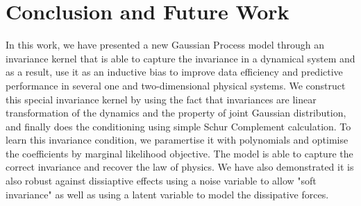 \documentclass{statsmsc}
\begin{document}
\chapter{Conclusion and Future Work}
In this work, we have presented a new Gaussian Process model through an invariance kernel that is able to capture the invariance in a dynamical system and as a result, use it as an inductive bias to improve data efficiency and predictive performance in several one and two-dimensional physical systems. 
We construct this special invariance kernel by using the fact that invariances are linear transformation of the dynamics and the property of joint Gaussian distribution, and finally does the conditioning using simple Schur Complement calculation.
To learn this invariance condition, we paramertise it with polynomials and optimise the coefficients by marginal likelihood objective. 
The model is able to capture the correct invariance and recover the law of physics.
We have also demonstrated it is also robust against dissiaptive effects using a noise variable to allow "soft invariance" as well as using a latent variable to model the dissipative forces. 
\end{document}
